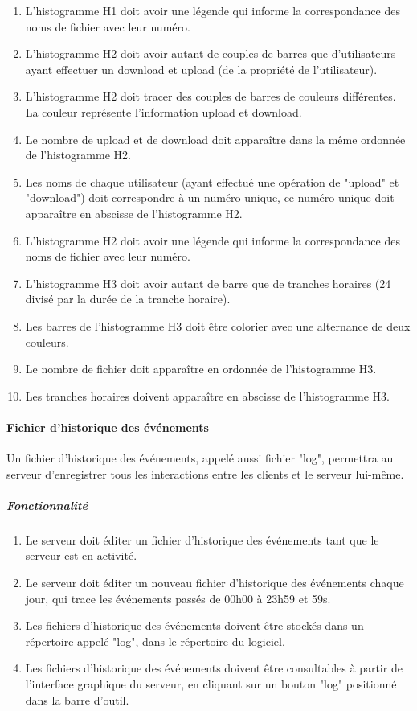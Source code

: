 \documentclass[10pt,a4paper]{report}
\begin{document}
\begin{enumerate}
			\item L'histogramme H1 doit avoir une légende qui informe la correspondance des noms de fichier avec leur numéro.
			\item L'histogramme H2 doit avoir autant de couples de barres que d'utilisateurs ayant effectuer un download et upload (de la propriété de l'utilisateur).
			\item L'histogramme H2 doit tracer des couples de barres de couleurs différentes. La couleur représente l'information upload et download.
			\item Le nombre de upload et de download doit apparaître dans la même ordonnée de l'histogramme H2.
			\item Les noms de chaque utilisateur (ayant effectué une opération de "upload" et "download") doit correspondre à un numéro unique, ce numéro unique doit apparaître en abscisse de l'histogramme H2.
			\item L'histogramme H2 doit avoir une légende qui informe la correspondance des noms de fichier avec leur numéro.
			\item L'histogramme H3 doit avoir autant de barre que de tranches horaires (24 divisé par la durée de la tranche horaire).
			\item Les barres de l'histogramme H3 doit être colorier avec une alternance de deux couleurs.
			\item Le nombre de fichier doit apparaître en ordonnée de l'histogramme H3.
			\item Les tranches horaires doivent apparaître en abscisse de l'histogramme H3.

		\end{enumerate}
		
\paragraph{Fichier d'historique des événements}

Un fichier d'historique des événements, appelé aussi fichier "log", permettra au serveur d'enregistrer tous les interactions entre les clients et le serveur lui-même.

	\subparagraph{Fonctionnalité}
		\begin{enumerate}
		
			\item Le serveur doit éditer un fichier d'historique des événements tant que le serveur est en activité.
		
			\item Le serveur doit éditer un nouveau fichier d'historique des événements chaque jour, qui trace les événements passés de 00h00 à 23h59 et 59s.
		
			\item Les fichiers d'historique des événements doivent être stockés dans un répertoire appelé "log", dans le répertoire du logiciel.
		
			\item Les fichiers d'historique des événements doivent être consultables à partir de l'interface graphique du serveur, en cliquant sur un bouton "log" positionné dans la barre d'outil.
			
		\end{enumerate}
		
\end{document}
